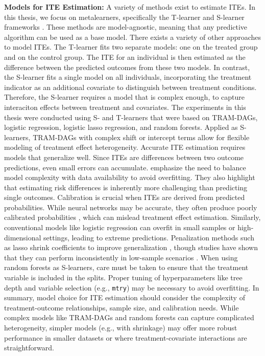 \textbf{Models for ITE Estimation:} \label{sec:ite_models} A variety of methods exist to estimate ITEs. In this thesis, we focus on metalearners, specifically the T-learner and S-learner frameworks \citep{kunzel2019}. These methods are model-agnostic, meaning that any predictive algorithm can be used as a base model. There exists a variety of other approaches to model ITEs. The T-learner fits two separate models: one on the treated group and on the control group. The ITE for an individual is then estimated as the difference between the predicted outcomes from these two models. In contrast, the S-learner fits a single model on all individuals, incorporating the treatment indicator as an additional covariate to distinguish between treatment conditions. Therefore, the S-learner requires a model that is complex enough, to capture interaciton effects between treatment and covariates. The experiments in this thesis were conducted using S- and T-learners that were based on TRAM-DAGs, logistic regression, logistic lasso regression, and random forests. Applied as S-learners, TRAM-DAGs with complex shift or intercept terms allow for flexible modeling of treatment effect heterogeneity. Accurate ITE estimation requires models that generalize well. Since ITEs are differences between two outcome predictions, even small errors can accumulate. \citet{hoogland2021} emphasize the need to balance model complexity with data availability to avoid overfitting. They also highlight that estimating risk differences is inherently more challenging than predicting single outcomes. Calibration is crucial when ITEs are derived from predicted probabilities. While neural networks may be accurate, they often produce poorly calibrated probabilities \citep{guo2017}, which can mislead treatment effect estimation. Similarly, conventional models like logistic regression can overfit in small samples or high-dimensional settings, leading to extreme predictions. Penalization methods such as lasso shrink coefficients to improve generalization \citep{riley2021}, though studies have shown that they can perform inconsistently in low-sample scenarios \citep{calster2020}. When using random forests as S-learners, care must be taken to ensure that the treatment variable is included in the splits. Proper tuning of hyperparameters like tree depth and variable selection (e.g., \texttt{mtry}) may be necessary to avoid overfitting.
In summary, model choice for ITE estimation should consider the complexity of treatment-outcome relationships, sample size, and calibration needs. While complex models like TRAM-DAGs and random forests can capture complicated heterogeneity, simpler models (e.g., with shrinkage) may offer more robust performance in smaller datasets or where treatment-covariate interactions are straightforward.



